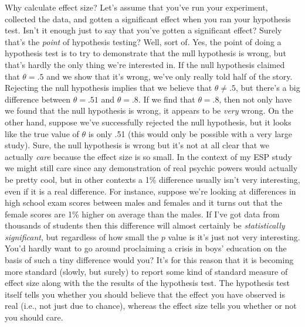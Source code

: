 Why calculate effect size? Let's assume that you've run your experiment, collected the data, and gotten a significant effect when you ran your hypothesis test. Isn't it enough just to say that you've gotten a significant effect? Surely that's the {\it point} of hypothesis testing? Well, sort of. Yes, the point of doing a hypothesis test is to try to demonstrate that the null hypothesis is wrong, but that's hardly the only thing we're interested in. If the null hypothesis claimed that $\theta = .5$ and we show that it's wrong, we've only really told half of the story. Rejecting the null hypothesis implies that we believe that $\theta \neq .5$, but there's a big difference between $\theta = .51$ and $\theta = .8$. If we find that $\theta = .8$, then not only have we found that the null hypothesis is wrong, it appears to be {\it very} wrong. On the other hand, suppose we've successfully rejected the null hypothesis, but it looks like the true value of $\theta$ is only .51 (this would only be possible with a very large study). Sure, the null hypothesis is wrong but it's not at all clear that we actually {\it care} because the effect size is so small. In the context of my ESP study we might still care since any demonstration of real psychic powers would actually be pretty cool, but in other contexts a 1\% difference usually isn't very interesting, even if it is a real difference. For instance, suppose we're looking at differences in high school exam scores between males and females and it turns out that the female scores are 1\% higher on average than the males. If I've got data from thousands of students then this difference will almost certainly be {\it statistically significant}, but regardless of how small the $p$ value is it's just not very interesting. You'd hardly want to go around proclaiming a crisis in boys' education on the basis of such a tiny difference would you? It's for this reason that it is becoming more standard (slowly, but surely) to report some kind of standard measure of effect size along with the the results of the hypothesis test. The hypothesis test itself tells you whether you should believe that the effect you have observed is real (i.e., not just due to chance), whereas the effect size tells you whether or not you should care.


